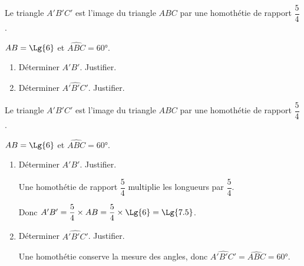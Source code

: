 \begin{exercice*}
    Le triangle $A'B'C'$ est l'image du triangle $ABC$ par une homothétie de rapport $\dfrac{5}{4}$.

    $AB=\Lg{6}$ et $\widehat{ABC}=\ang{60}$.
    \begin{enumerate}
        \item Déterminer $A'B'$. Justifier.
        \item Déterminer $\widehat{A'B'C'}$. Justifier.
    \end{enumerate}
\end{exercice*}
\begin{corrige}
    Le triangle $A'B'C'$ est l'image du triangle $ABC$ par une homothétie de rapport $\dfrac{5}{4}$.

    $AB=\Lg{6}$ et $\widehat{ABC}=\ang{60}$.
    \begin{enumerate}
        \item Déterminer $A'B'$. Justifier.
        
        {\color{red} Une homothétie de rapport $\dfrac{5}{4}$ multiplie les longueurs par $\dfrac{5}{4}$. 
        
        Donc $A'B' = \dfrac{5}{4}\times AB = \dfrac{5}{4}\times\Lg{6}=\Lg{7.5}$.}
        \item Déterminer $\widehat{A'B'C'}$. Justifier.
        
        {\color{red} Une homothétie conserve la mesure des angles, donc $\widehat{A'B'C'}=\widehat{ABC}=\ang{60}$.}
    \end{enumerate}
   
\end{corrige}

